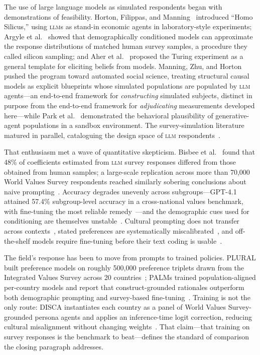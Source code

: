 \documentclass[10pt,letterpaper]{article}
\newcommand{\LLM}{\textsc{llm}}
\begin{document}
The use of large language models as simulated respondents began with demonstrations of feasibility. Horton, Filippas, and Manning~\cite{horton2023} introduced ``Homo Silicus,'' using \LLM{}s as stand-in economic agents in laboratory-style experiments; Argyle et al.~\cite{argyle2023} showed that demographically conditioned models can approximate the response distributions of matched human survey samples, a procedure they called silicon sampling; and Aher et al.~\cite{aher2023} proposed the Turing experiment as a general template for eliciting beliefs from models. Manning, Zhu, and Horton~\cite{manning2024} pushed the program toward automated social science, treating structural causal models as explicit blueprints whose simulated populations are populated by \LLM{} agents---an end-to-end framework for \emph{constructing} simulated subjects, distinct in purpose from the end-to-end framework for \emph{adjudicating} measurements developed here---while Park et al.~\cite{park2024} demonstrated the behavioral plausibility of generative-agent populations in a sandbox environment. The survey-simulation literature matured in parallel, cataloguing the design space of \LLM{} respondents~\cite{ziems2024}.

That enthusiasm met a wave of quantitative skepticism. Bisbee et al.~\cite{bisbee2024} found that 48\% of coefficients estimated from \LLM{} survey responses differed from those obtained from human samples; a large-scale replication across more than 70{,}000 World Values Survey respondents reached similarly sobering conclusions about naive prompting~\cite{morocho2026}. Accuracy degrades unevenly across subgroups---GPT-4.1 attained 57.4\% subgroup-level accuracy in a cross-national values benchmark, with fine-tuning the most reliable remedy~\cite{subgroupvalues2026}---and the demographic cues used for conditioning are themselves unstable~\cite{tonneau2026}. Cultural prompting does not transfer across contexts~\cite{tao2024}, stated preferences are systematically miscalibrated~\cite{wangcalibration2026}, and off-the-shelf models require fine-tuning before their text coding is usable~\cite{landesvatter2026}.

The field's response has been to move from prompts to trained policies. PLURAL built preference models on roughly 500{,}000 preference triplets drawn from the Integrated Values Survey across 20 countries~\cite{plural2026}; PALMs trained population-aligned per-country models and report that construct-grounded rationales outperform both demographic prompting and survey-based fine-tuning~\cite{palms2026}. Training is not the only route: DISCA instantiates each country as a panel of World Values Survey-grounded persona agents and applies an inference-time logit correction, reducing cultural misalignment without changing weights~\cite{disca2026}. That claim---that training on survey responses is the benchmark to beat---defines the standard of comparison the closing paragraph addresses.
\end{document}
